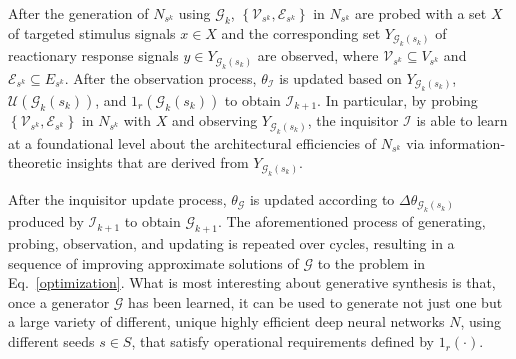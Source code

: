 \documentclass{article}
\begin{document}
After the generation of ${N}_{s^k}$ using $\mathcal{G}_k$, $\left\{\mathcal{V}_{s^k},\mathcal{E}_{s^k}\right\}$ in ${N}_{s^k}$ are probed with a set $X$ of targeted stimulus signals $x \in X$ and the corresponding set $Y_{\mathcal{G}_k\left(s_k\right)}$ of reactionary response signals $y \in Y_{\mathcal{G}_k\left(s_k\right)}$ are observed, where $\mathcal{V}_{s^k} \subseteq V_{s^k}$ and $\mathcal{E}_{s^k} \subseteq E_{s^k}$.  After the observation process, $\theta_{\mathcal{I}}$ is updated based on $Y_{\mathcal{G}_k\left(s_k\right)}$, $\mathcal{U}(\mathcal{G}_k\left(s_k\right))$, and $1_r(\mathcal{G}_k\left(s_k\right))$ to obtain $\mathcal{I}_{k+1}$.  In particular, by probing $\left\{\mathcal{V}_{s^k},\mathcal{E}_{s^k}\right\}$ in ${N}_{s^k}$ with $X$ and observing $Y_{\mathcal{G}_k\left(s_k\right)}$, the inquisitor $\mathcal{I}$ is able to learn at a foundational level about the architectural efficiencies of ${N}_{s^k}$ via information-theoretic insights that are derived from $Y_{\mathcal{G}_k\left(s_k\right)}$.

After the inquisitor update process, $\theta_{\mathcal{G}}$ is updated according to $\Delta\theta_{\mathcal{G}_{k}\left(s_k\right)}$ produced by $\mathcal{I}_{k+1}$ to obtain $\mathcal{G}_{k+1}$.  The aforementioned process of generating, probing, observation, and updating is repeated over cycles, resulting in a sequence of improving approximate solutions of $\mathcal{G}$ to the problem in Eq.~\ref{optimization}.  What is most interesting about generative synthesis is that, once a generator $\mathcal{G}$ has been learned, it can be used to generate not just one but a large variety of different, unique highly efficient deep neural networks ${N}$, using different seeds $s \in S$, that satisfy operational requirements defined by $1_r(\cdot)$.
\vspace{-0.1in}
\end{document}

